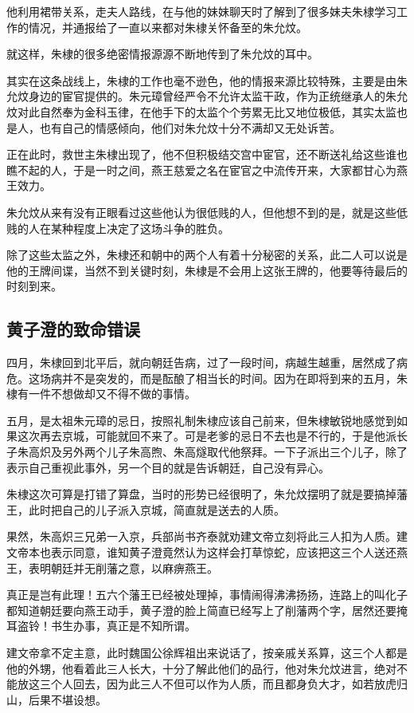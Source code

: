 \begin{multicols}{\theparacolNo}
		他利用裙带关系，走夫人路线，在与他的妹妹聊天时了解到了很多妹夫朱棣学习工作的情况，并通报给了一直以来都对朱棣关怀备至的朱允炆。

		就这样，朱棣的很多绝密情报源源不断地传到了朱允炆的耳中。

		其实在这条战线上，朱棣的工作也毫不逊色，他的情报来源比较特殊，主要是由朱允炆身边的宦官提供的。朱元璋曾经严令不允许太监干政，作为正统继承人的朱允炆对此自然奉为金科玉律，在他手下的太监个个劳累无比又地位极低，其实太监也是人，也有自己的情感倾向，他们对朱允炆十分不满却又无处诉苦。

		正在此时，救世主朱棣出现了，他不但积极结交宫中宦官，还不断送礼给这些谁也瞧不起的人，于是一时之间，燕王慈爱之名在宦官之中流传开来，大家都甘心为燕王效力。

		朱允炆从来有没有正眼看过这些他认为很低贱的人，但他想不到的是，就是这些低贱的人在某种程度上决定了这场斗争的胜负。

		除了这些太监之外，朱棣还和朝中的两个人有着十分秘密的关系，此二人可以说是他的王牌间谍，当然不到关键时刻，朱棣是不会用上这张王牌的，他要等待最后的时刻到来。

		\subsection{黄子澄的致命错误}
		四月，朱棣回到北平后，就向朝廷告病，过了一段时间，病越生越重，居然成了病危。这场病并不是突发的，而是酝酿了相当长的时间。因为在即将到来的五月，朱棣有一件不想做却又不得不做的事情。

		五月，是太祖朱元璋的忌日，按照礼制朱棣应该自己前来，但朱棣敏锐地感觉到如果这次再去京城，可能就回不来了。可是老爹的忌日不去也是不行的，于是他派长子朱高炽及另外两个儿子朱高煦、朱高燧取代他祭拜。一下子派出三个儿子，除了表示自己重视此事外，另一个目的就是告诉朝廷，自己没有异心。

		朱棣这次可算是打错了算盘，当时的形势已经很明了，朱允炆摆明了就是要搞掉藩王，此时把自己的儿子派入京城，简直就是送去的人质。

		果然，朱高炽三兄弟一入京，兵部尚书齐泰就劝建文帝立刻将此三人扣为人质。建文帝本也表示同意，谁知黄子澄竟然认为这样会打草惊蛇，应该把这三个人送还燕王，表明朝廷并无削藩之意，以麻痹燕王。

		真正是岂有此理！五六个藩王已经被处理掉，事情闹得沸沸扬扬，连路上的叫化子都知道朝廷要向燕王动手，黄子澄的脸上简直已经写上了削藩两个字，居然还要掩耳盗铃！书生办事，真正是不知所谓。

		建文帝拿不定主意，此时魏国公徐辉祖出来说话了，按亲戚关系算，这三个人都是他的外甥，他看着此三人长大，十分了解此他们的品行，他对朱允炆进言，绝对不能放这三个人回去，因为此三人不但可以作为人质，而且都身负大才，如若放虎归山，后果不堪设想。


\end{multicols}
